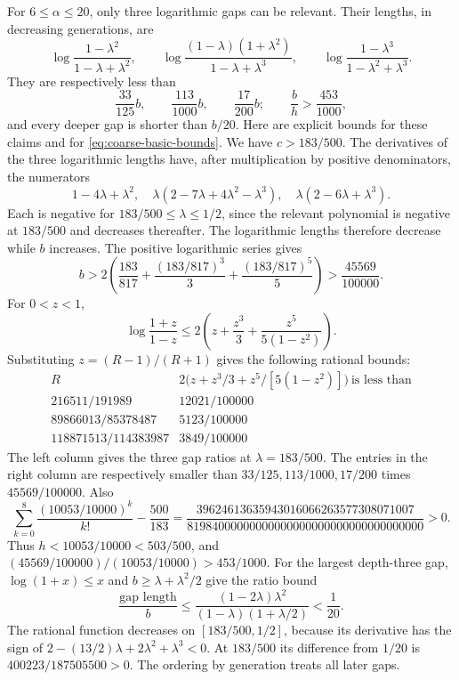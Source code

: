 For $6\le\alpha\le20$, only three logarithmic gaps can be relevant.
Their lengths, in decreasing generations, are
\[
 \log\frac{1-\lambda^2}{1-\lambda+\lambda^2},\qquad
 \log\frac{(1-\lambda)(1+\lambda^2)}{1-\lambda+\lambda^3},\qquad
 \log\frac{1-\lambda^3}{1-\lambda^2+\lambda^3}.
\]
They are respectively less than
\begin{equation}\label{eq:coarse-three-gaps}
 \frac{33}{125}b,\qquad\frac{113}{1000}b,\qquad\frac{17}{200}b;
 \qquad \frac bh>\frac{453}{1000},
\end{equation}
and every deeper gap is shorter than $b/20$.
Here are explicit bounds for these claims and for
\eqref{eq:coarse-basic-bounds}. We have $c>183/500$.
The derivatives of the three logarithmic lengths have, after multiplication
by positive denominators, the numerators
\[
 1-4\lambda+\lambda^2,\quad
 \lambda(2-7\lambda+4\lambda^2-\lambda^3),\quad
 \lambda(2-6\lambda+\lambda^3).
\]
Each is negative for $183/500\le\lambda\le1/2$, since the relevant polynomial
is negative at $183/500$ and decreases thereafter. The logarithmic lengths
therefore decrease while $b$ increases.
The positive logarithmic series gives
\[
 b>2\left(\frac{183}{817}+\frac{(183/817)^3}{3}
                   +\frac{(183/817)^5}{5}\right)>\frac{45569}{100000}.
\]
For $0<z<1$,
\[
 \log\frac{1+z}{1-z}
 \le2\left(z+\frac{z^3}{3}+\frac{z^5}{5(1-z^2)}\right).
\]
Substituting $z=(R-1)/(R+1)$ gives the following rational bounds:
\[
\begin{array}{c|c}
R&2\bigl(z+z^3/3+z^5/[5(1-z^2)]\bigr)\ \text{is less than}\\ \hline
216511/191989&12021/100000\\
89866013/85378487&5123/100000\\
118871513/114383987&3849/100000
\end{array}
\]
The left column gives the three gap ratios at $\lambda=183/500$.
The entries in the right column are respectively smaller than
$33/125,113/1000,17/200$ times $45569/100000$.
Also
\[
 \sum_{k=0}^{8}\frac{(10053/10000)^k}{k!}-\frac{500}{183}
 =\frac{39624613635943016066263577308071007}
 {81984000000000000000000000000000000000}>0.
\]
Thus $h<10053/10000<503/500$, and
$(45569/100000)/(10053/10000)>453/1000$.
For the largest depth-three gap, $\log(1+x)\le x$ and
$b\ge\lambda+\lambda^2/2$ give the ratio bound
\[
 \frac{\text{gap length}}b
 \le\frac{(1-2\lambda)\lambda^2}{(1-\lambda)(1+\lambda/2)}<\frac1{20}.
\]
The rational function decreases on $[183/500,1/2]$, because its derivative
has the sign of $2-(13/2)\lambda+2\lambda^2+\lambda^3<0$.
At $183/500$ its difference from $1/20$ is
$400223/187505500>0$. The ordering by generation treats all later gaps.

